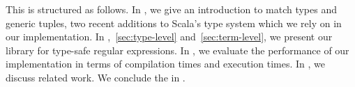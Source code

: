 \begin{diff}
This \paper is structured as follows.
In , we give an introduction to match types and generic tuples, two recent additions to Scala's type system which we rely on in our implementation.
In ,~\ref{sec:type-level} and~\ref{sec:term-level}, we present our library for type-safe regular expressions.
In , we evaluate the performance of our implementation in terms of compilation times and execution times.
In , we discuss related work.
We conclude the \paper in .
\end{diff}


